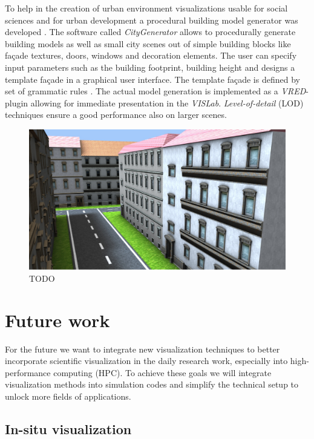 To help in the creation of urban environment visualizations usable for social sciences and for urban development a procedural \cite{procedural:modelling} building model generator was developed \cite{bilke:master}. The software called \emph{CityGenerator} \cite{bilke:citygenerator} allows to procedurally generate building models as well as small city scenes out of simple building blocks like façade textures, doors, windows and decoration elements. The user can specify input parameters such as the building footprint, building height and designs a template façade in a graphical user interface. The template façade is defined by set of grammatic rules \cite{procedural:buildings}. The actual model generation is implemented as a \emph{VRED}-plugin allowing for immediate presentation in the \emph{VISLab}. \emph{Level-of-detail} (LOD) techniques ensure a good performance also on larger scenes.

\begin{figure}
  \includegraphics[width=\linewidth]{images/city.jpg}
\caption{TODO}
\label{fig:city}
\end{figure}

\section{Future work}
\label{future-work}

For the future we want to integrate new visualization techniques to
better incorporate scientific visualization in the daily research work,
especially into high-performance computing (HPC). To achieve these goals
we will integrate visualization methods into simulation codes and simplify
the technical setup to unlock more fields of applications.

\subsection{In-situ visualization}
\label{in-situ-visualization}

